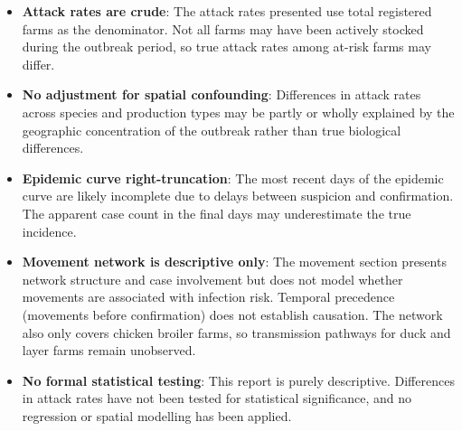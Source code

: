 \documentclass[
]{article}
\begin{document}
\begin{itemize}
\item
  \textbf{Attack rates are crude}: The attack rates presented use total
  registered farms as the denominator. Not all farms may have been
  actively stocked during the outbreak period, so true attack rates
  among at-risk farms may differ.
\item
  \textbf{No adjustment for spatial confounding}: Differences in attack
  rates across species and production types may be partly or wholly
  explained by the geographic concentration of the outbreak rather than
  true biological differences.
\item
  \textbf{Epidemic curve right-truncation}: The most recent days of the
  epidemic curve are likely incomplete due to delays between suspicion
  and confirmation. The apparent case count in the final days may
  underestimate the true incidence.
\item
  \textbf{Movement network is descriptive only}: The movement section
  presents network structure and case involvement but does not model
  whether movements are associated with infection risk. Temporal
  precedence (movements before confirmation) does not establish
  causation. The network also only covers chicken broiler farms, so
  transmission pathways for duck and layer farms remain unobserved.
\item
  \textbf{No formal statistical testing}: This report is purely
  descriptive. Differences in attack rates have not been tested for
  statistical significance, and no regression or spatial modelling has
  been applied.
\end{itemize}
\end{document}
